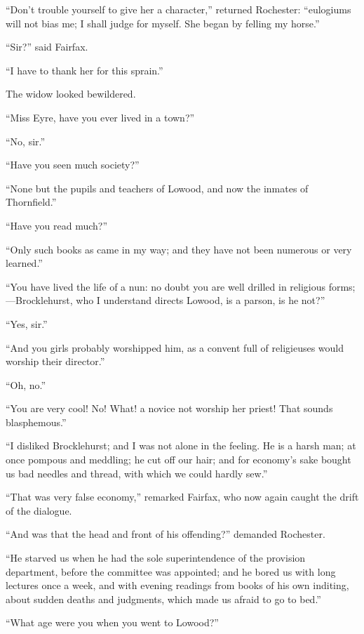 \enquote{Don't trouble yourself to give her a character,} returned \Mr{}
Rochester: \enquote{eulogiums will not bias me; I shall judge for
	myself. She began by felling my horse.}

\enquote{Sir?} said \Mrs{} Fairfax.

\enquote{I have to thank her for this sprain.}

The widow looked bewildered.

\enquote{Miss Eyre, have you ever lived in a town?}

\enquote{No, sir.}

\enquote{Have you seen much society?}

\enquote{None but the pupils and teachers of Lowood, and now the inmates
	of Thornfield.}

\enquote{Have you read much?}

\enquote{Only such books as came in my way; and they have not been
	numerous or very learned.}

\enquote{You have lived the life of a nun: no doubt you are well drilled
	in religious forms;---Brocklehurst, who I understand directs Lowood, is
	a parson, is he not?}

\enquote{Yes, sir.}

\enquote{And you girls probably worshipped him, as a convent full of
	religieuses would worship their director.}

\enquote{Oh, no.}

\enquote{You are very cool! No! What! a novice not worship her
	priest! That sounds blasphemous.}

\enquote{I disliked \Mr{} Brocklehurst; and I was not alone in the
	feeling. He is a harsh man; at once pompous and meddling; he cut off
	our hair; and for economy's sake bought us bad needles and thread, with
	which we could hardly sew.}

\enquote{That was very false economy,} remarked \Mrs{} Fairfax, who now
again caught the drift of the dialogue.

\enquote{And was that the head and front of his offending?} demanded \Mr{}
Rochester.

\enquote{He starved us when he had the sole superintendence of the
	provision department, before the committee was appointed; and he bored
	us with long lectures once a week, and with evening readings from books
	of his own inditing, about sudden deaths and judgments, which made us
	afraid to go to bed.}

\enquote{What age were you when you went to Lowood?}

